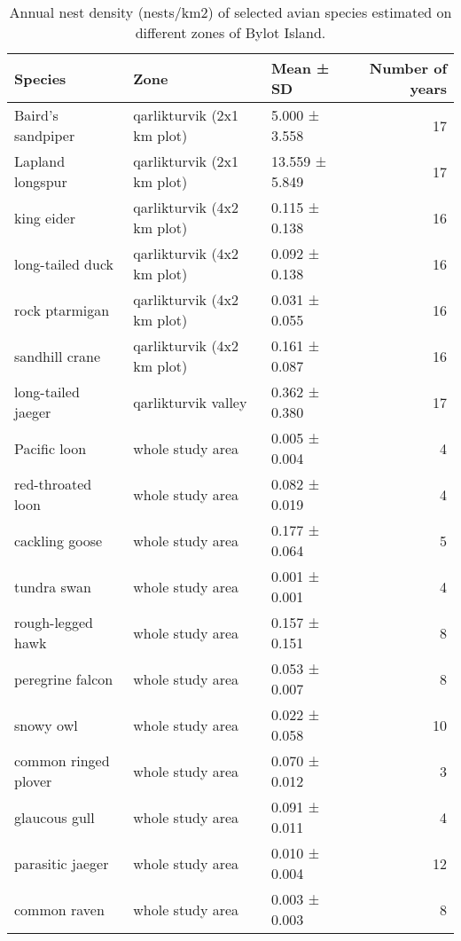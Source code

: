 \begin{table}[ht]
\centering
\caption{Annual nest density (nests/km2) of selected avian species estimated on different zones of Bylot Island.} 
\label{table:interannual_nest_density_variation}
\begingroup\fontsize{10pt}{10pt}\selectfont
\begin{tabularx}{0.9\textwidth}{lllr}
  \hline
Species & Zone & Mean ± SD & Number of years \\ 
  \hline
Baird's sandpiper & qarlikturvik (2x1 km plot) & 5.000 ± 3.558 &  17 \\ 
  Lapland longspur & qarlikturvik (2x1 km plot) & 13.559 ± 5.849 &  17 \\ 
  king eider & qarlikturvik (4x2 km plot) & 0.115 ± 0.138 &  16 \\ 
  long-tailed duck & qarlikturvik (4x2 km plot) & 0.092 ± 0.138 &  16 \\ 
  rock ptarmigan & qarlikturvik (4x2 km plot) & 0.031 ± 0.055 &  16 \\ 
  sandhill crane & qarlikturvik (4x2 km plot) & 0.161 ± 0.087 &  16 \\ 
  long-tailed jaeger & qarlikturvik valley & 0.362 ± 0.380 &  17 \\ 
  Pacific loon & whole study area & 0.005 ± 0.004 &   4 \\ 
  red-throated loon & whole study area & 0.082 ± 0.019 &   4 \\ 
  cackling goose & whole study area & 0.177 ± 0.064 &   5 \\ 
  tundra swan & whole study area & 0.001 ± 0.001 &   4 \\ 
  rough-legged hawk & whole study area & 0.157 ± 0.151 &   8 \\ 
  peregrine falcon & whole study area & 0.053 ± 0.007 &   8 \\ 
  snowy owl & whole study area & 0.022 ± 0.058 &  10 \\ 
  common ringed plover & whole study area & 0.070 ± 0.012 &   3 \\ 
  glaucous gull & whole study area & 0.091 ± 0.011 &   4 \\ 
  parasitic jaeger & whole study area & 0.010 ± 0.004 &  12 \\ 
  common raven & whole study area & 0.003 ± 0.003 &   8 \\ 
   \hline
\end{tabularx}
\endgroup
\end{table}
